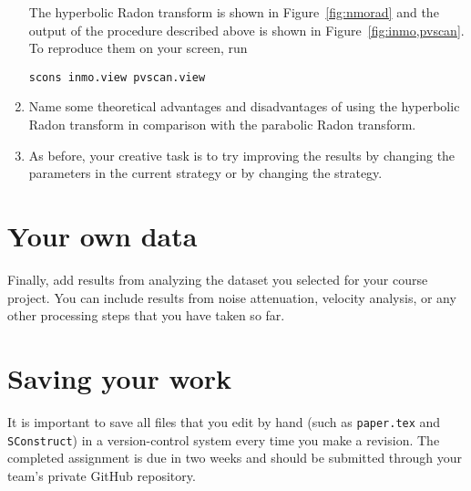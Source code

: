 \begin{enumerate}
The hyperbolic Radon transform is shown in Figure~\ref{fig:nmorad} and the output of the procedure described above is shown in Figure~\ref{fig:inmo,pvscan}. To reproduce them on your screen, run
\begin{verbatim}
scons inmo.view pvscan.view
\end{verbatim}

\item Name some theoretical advantages and disadvantages of using the hyperbolic Radon transform in comparison with the parabolic Radon transform.

\item As before, your creative task is to try improving the results by changing the parameters in the current strategy or by changing the strategy.

\end{enumerate}

\lstset{language=c,numbers=left,numberstyle=\tiny,showstringspaces=false}


\lstset{language=python,numbers=left,numberstyle=\tiny,showstringspaces=false}


\section{Your own data}

Finally, add results from analyzing the dataset you selected for your
course project. You can include results from noise attenuation,
velocity analysis, or any other processing steps that you have taken so far.

\section{Saving your work}

It is important to save all files that you edit by hand (such
as \texttt{paper.tex} and \texttt{SConstruct}) in a version-control
system every time you make a revision.  The completed assignment is
due in two weeks and should be submitted through your team's private
GitHub repository.





